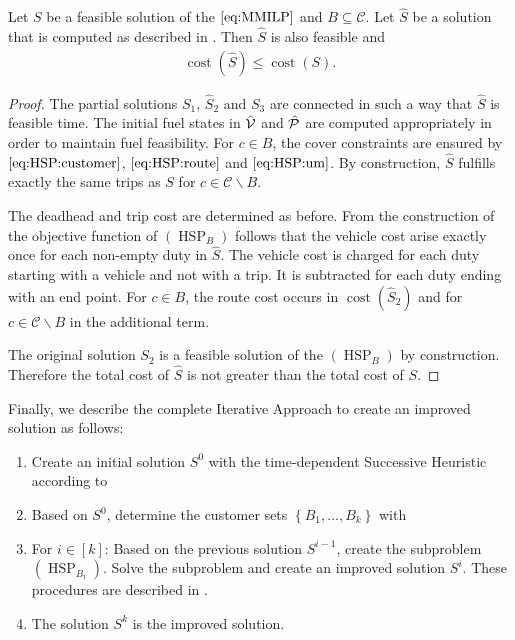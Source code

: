 \begin{lemma}
\label{lem:feasibility_hsp}

Let $S$ be a feasible solution of the $\eqref{eq:MMILP}$ and $B\subseteq\mathcal{C}$. Let $\widehat{S}$ be a solution that is computed as described in . Then $\widehat{S}$ is also feasible and
\begin{align*}
	\operatorname{cost}\left(\widehat{S}\right) \leq \operatorname{cost}\left(S\right).
\end{align*}

\end{lemma}

\begin{proof}

The partial solutions $S_1$, $\widehat{S}_2$ and $S_3$ are connected in such a way that $\widehat{S}$ is feasible \wrt time. The initial fuel states in $\hat{\mathcal{V}}$ and $\hat{\mathcal{P}}$ are computed appropriately in order to maintain fuel feasibility. For ${c\in B}$, the cover constraints are ensured by $\eqref{eq:HSP:customer}$, $\eqref{eq:HSP:route}$ and $\eqref{eq:HSP:um}$. By construction, $\widehat{S}$ fulfills exactly the same trips as $S$ for ${c\in\mathcal{C}\backslash B}$.

The deadhead and trip cost are determined as before. From the construction of the objective function of $(\operatorname{HSP}_B)$ follows that the vehicle cost arise exactly once for each non-empty duty in $\widehat{S}$. The vehicle cost is charged for each duty starting with a vehicle and not with a trip. It is subtracted for each duty ending with an end point. For ${c\in B}$, the route cost occurs in $\operatorname{cost}\left(\widehat{S}_2\right)$ and for ${c\in\mathcal{C}\backslash B}$ in the additional term.

The original solution $S_2$ is a feasible solution of the $(\operatorname{HSP}_B)$ by construction. Therefore the total cost of $\widehat{S}$ is not greater than the total cost of $S$.
%
\end{proof}

Finally, we describe the complete Iterative Approach to create an improved solution as follows:
\begin{enumerate}
	\item Create an initial solution $S^0$ with the time-dependent Successive Heuristic according to 
	\item Based on $S^0$, determine the customer sets $\left\{B_1,\dots,B_k\right\}$ with 
	\item For $i\in[k]$: Based on the previous solution $S^{i-1}$, create the subproblem $(\operatorname{HSP}_{B_i})$. Solve the subproblem and create an improved solution $S^i$. These procedures are described in .
	\item The solution $S^k$ is the improved solution.
\end{enumerate}

